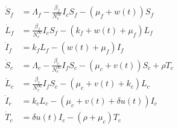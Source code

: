 \documentclass[preprint, 12pt]{elsarticle}
\begin{document}
    \begin{equation}\label{Eq:SIvectorhostmodelcontrol}
        \begin{aligned}
            \dot{S}_f&=
                \Lambda_f-\frac{\beta_f}{N_c^{\infty}}I_c S_f-(\mu_f+w(t))S_f
            \\
            \dot{L}_f&=
                \frac{\beta_f}{N_c^{\infty}} I_c S_f-
                \left(
                    k_f + w(t) + \mu_f
                \right) L_f
            \\
            \dot{I}_f&=
                k_f L_f-(w(t)+\mu_f)I_f
            \\
            \dot{S}_c&=
                \Lambda_c-\frac{\beta_c}{N_c^{\infty}}I_f S_c-
                \left(
                    \mu_c + v(t)
                \right)
                S_c + \rho T_c
            \\
            \dot{L}_c&=
                \frac{\beta_c}{N_c^{\infty}} I_f S_c -
                \left(
                    \mu_c + v(t) +
                    k_c
                \right)L_c
            \\
            \dot{I}_c&=
                k_c L_c -
                (\mu_c + v(t) + \delta u(t))I_c
            \\
            \dot{T}_c&=
                \delta u(t) I_c -
                \left(
                    \rho  + \mu_c
                \right) T_c
            \\
        \end{aligned}
    \end{equation}
\end{document}

